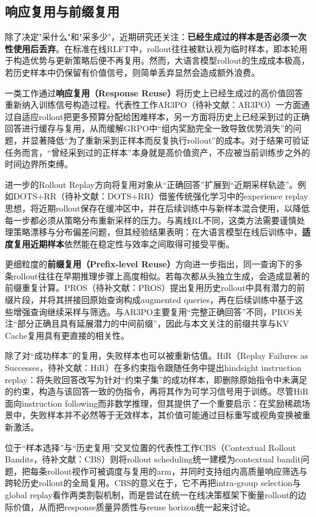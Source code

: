 \subsection{响应复用与前缀复用}
\label{subsec:response_prefix_reuse}

除了决定"采什么"和"采多少"，近期研究还关注：\textbf{已经生成过的样本是否必须一次性使用后丢弃}。在标准在线RLFT中，rollout往往被默认视为临时样本，即本轮用于构造优势与更新策略后便不再复用。然而，大语言模型rollout的生成成本极高，若历史样本中仍保留有价值信号，则简单丢弃显然会造成额外浪费。

一类工作通过\textbf{响应复用（Response Reuse）}将历史上已经生成过的高价值回答重新纳入训练信号构造过程。代表性工作AR3PO（待补文献：AR3PO）一方面通过自适应rollout把更多预算分配给困难样本，另一方面将历史上已经采到过的正确回答进行缓存与复用，从而缓解GRPO中“组内奖励完全一致导致优势消失”的问题，并显著降低“为了重新采到正样本而反复执行rollout”的成本。对于结果可验证任务而言，“曾经采到过的正样本”本身就是高价值资产，不应被当前训练步之外的时间边界所束缚。

进一步的Rollout Replay方向将复用对象从“正确回答”扩展到“近期采样轨迹”。例如DOTS+RR（待补文献：DOTS+RR）借鉴传统强化学习中的experience replay思想，将近期rollout保存在缓冲区中，并在后续训练中与新样本混合使用，以降低每一步都必须从策略分布重新采样的压力。与离线RL不同，这类方法需要谨慎处理策略漂移与分布偏差问题，但其经验结果表明：在大语言模型在线后训练中，\textbf{适度复用近期样本}依然能在稳定性与效率之间取得可接受平衡。

更细粒度的\textbf{前缀复用（Prefix-level Reuse）}方向进一步指出，同一查询下的多条rollout往往在早期推理步骤上高度相似。若每次都从头独立生成，会造成显著的前缀重复计算。PROS（待补文献：PROS）提出复用历史rollout中具有潜力的前缀片段，并将其拼接回原始查询构成augmented queries，再在后续训练中基于这些增强查询继续采样与筛选。与AR3PO主要复用“完整正确回答”不同，PROS关注“部分正确且具有延展潜力的中间前缀”，因此与本文关注的前缀共享与KV Cache复用具有更直接的相关性。

除了对“成功样本”的复用，失败样本也可以被重新估值。HiR（Replay Failures as Successes，待补文献：HiR）在多约束指令跟随任务中提出hindsight instruction replay：将失败回答改写为针对“约束子集”的成功样本，即删除原始指令中未满足的约束，构造与该回答一致的伪指令，再将其作为可学习信号用于训练。尽管HiR面向instruction following而非数学推理，但其提供了一个重要启示：在奖励稀疏场景中，失败样本并不必然等于无效样本，其价值可能通过目标重写或视角变换被重新激活。

位于“样本选择”与“历史复用”交叉位置的代表性工作CBS（Contextual Rollout Bandits，待补文献：CBS）则将rollout scheduling统一建模为contextual bandit问题，把每条rollout视作可被调度与复用的arm，并同时支持组内高质量响应筛选与跨轮历史rollout的全局复用。CBS的意义在于，它不再把intra-group selection与global replay看作两类割裂机制，而是尝试在统一在线决策框架下衡量rollout的边际价值，从而把response质量异质性与reuse horizon统一起来讨论。

